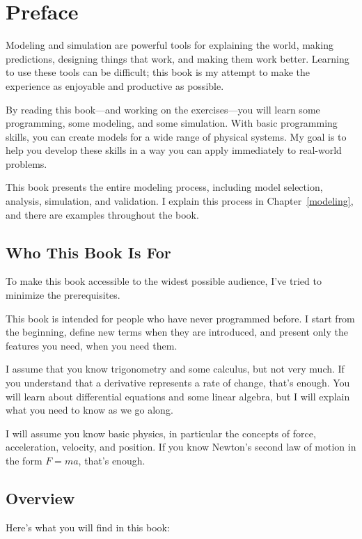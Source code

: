 
\chapter{Preface}

Modeling and simulation are powerful tools for explaining the world, making predictions, designing things that work, and making them work better.  Learning to use these tools can be difficult; this book is my attempt to make the experience as enjoyable and productive as possible.

By reading this book---and working on the exercises---you will learn some programming, some modeling, and some simulation.
With basic programming skills, you can create models for a wide range of physical systems.
My goal is to help you develop these skills in a way you can apply immediately to real-world problems.

This book presents the entire modeling process, including model selection, analysis, simulation, and validation.  I explain this process in Chapter~\ref{modeling}, and there are examples throughout the book.

\section{Who This Book Is For}

To make this book accessible to the widest possible audience, I've tried to minimize the prerequisites.

This book is intended for people who have never programmed before.  I start from the beginning, define new terms when they are introduced, and present only the features you need, when you need them.

I assume that you know trigonometry and some calculus, but not very much.  If you understand that a derivative represents a rate of change, that's enough.  You will learn about differential equations and some linear algebra, but I will explain what you need to know as we go along.

I will assume you know basic physics, in particular the concepts of force, acceleration, velocity, and position.  If you know Newton's second law of motion in the form $F = m a$, that's enough.

\section{Overview}

Here's what you will find in this book:

